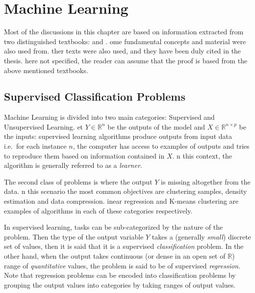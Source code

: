 

\chapter{Machine Learning}\label{ch:machineLearning}

Most of the discussions in this chapter are based on information extracted from two distinguished textbooks: \textcite{bishop-patternRecognition} and \textcite{hastie-elemstatslearn}.
ome fundamental concepts and material were also used from\cite{scikit-learn}.
ther texts were also used, and they have been duly cited in the thesis.
here not specified, the reader can assume that the proof is based from the above mentioned textbooks.


\section{Supervised Classification Problems}\label{section-supervised-learning}


Machine Learning is divided into two main categories: Supervised and Unsupervised Learning.
et $Y \in \mathbb{R}^n$ be the outputs of the model and $X \in \mathbb{R}^{n \times p}$ be the inputs: supervised learning algorithms produce outputs from input data i.e.\ for each instance $n$, the computer has access to examples of outputs and tries to reproduce them based on information contained in $X$.
n this context, the algorithm is generally referred to as a \textit{learner}.

The second class of problems is where the output $Y$ is missing altogether from the data.
n this scenario the most common objectives are clustering samples, density estimation and data compression.
inear regression and K-means clustering are examples of algorithms in each of these categories respectively.


In supervised learning, tasks can be sub-categorized by the nature of the problem.
Then the type of the output variable $Y$ takes a (generally \textit{small}) discrete set of values, then it is said that it is a supervised \textit{classification} problem.
In the other hand, when the output takes continuous (or dense in an open set of $\mathbb{R}$) range of \textit{quantitative} values, the problem is said to be of supervised \textit{regression}.
Note that regression problems can be encoded into classification problems by grouping the output values into categories by taking ranges of output values.

